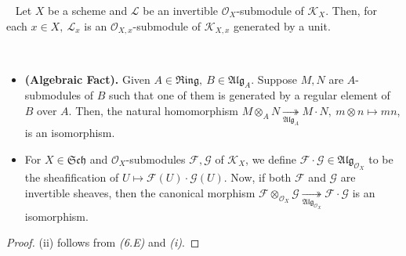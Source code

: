 \documentclass[11pt,a4paper,footinclude=true,headinclude=true]{scrbook} %
\newcommand{\FF}{\mathscr{F}}
\newcommand{\GG}{\mathscr{G}}
\newcommand{\KK}{\mathscr{K}}
\newcommand{\LL}{\mathscr{L}}
\newcommand{\OO}{\mathcal{O}}
\newcommand{\Sch}{\mathfrak{Sch}}
\newcommand{\Ring}{\mathfrak{Ring}}
\newcommand{\<}{\langle}
\newcommand{\>}{\rangle}
\newcommand{\ALG}{\mathfrak{Alg}}
\newenvironment{lemma}[2][]
{\renewcommand\theinnercustomlemma{#2}\innercustomlemma[#1]
\begin{mdframed}[backgroundcolor=gray!20]\ }
{\end{mdframed}\endinnercustomprop}
\newenvironment{corollary}[2][]
{\renewcommand\theinnercustomcol{#2}\innercustomcol[#1]
\begin{mdframed}[backgroundcolor=gray!20]\ }
{\end{mdframed}\endinnercustomcol}
\begin{document}
\begin{corollary}{6.E}
    Let $X$ be a scheme and $\LL$ be an invertible $\OO_X$-submodule of $\KK_X$. Then, for each $x\in X,\ \LL_x$ is an $\OO_{X,x}$-submodule of $\KK_{X,x}$ generated by a unit.
\end{corollary}
\newpage
\begin{lemma}{6.F}
    \begin{itemize}
        \item[(i)] \textbf{(Algebraic Fact).} Given $A\in\Ring,\ B\in\ALG_A$. Suppose $M,N$ are $A$-submodules of $B$ such that one of them is generated by a regular element of $B$ over $A$. Then, the natural homomorphism $M\otimes_AN\underset{\ALG_A}{\twoheadrightarrow}M\cdot N,\ m\otimes n\mapsto mn$, is an isomorphism.
        \item[(ii)] For $X\in\Sch$ and $\OO_X$-submodules $\FF,\GG$ of $\KK_X$, we define $\FF\cdot\GG\in\ALG_{\OO_X}$ to be the sheafification of $U\mapsto\FF(U)\cdot\GG(U)$. Now, if both $\FF$ and $\GG$ are invertible sheaves, then the canonical morphism $\FF\otimes_{\OO_X}\GG\underset{\ALG_{\OO_X}}{\twoheadrightarrow}\FF\cdot\GG$ is an isomorphism.
    \end{itemize}
\end{lemma}
\begin{proof}
    (ii) follows from \textit{(6.E)} and \textit{(i)}.
\end{proof}
\end{document}
